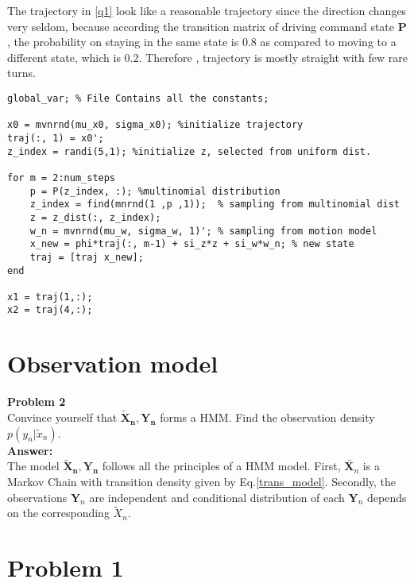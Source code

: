 \documentclass[a4paper]{article}
\begin{document}
The trajectory in \ref{q1} look like a reasonable trajectory since the direction changes very seldom, because according the transition matrix of driving command state $\boldsymbol{P}$, the probability on staying in the same state is $0.8$ as compared to moving to a different state, which  is $0.2$. Therefore , trajectory is mostly straight with few rare turns.\\

\begin{lstlisting}
global_var; % File Contains all the constants; 

x0 = mvnrnd(mu_x0, sigma_x0); %initialize trajectory
traj(:, 1) = x0'; 
z_index = randi(5,1); %initialize z, selected from uniform dist.

for m = 2:num_steps    
    p = P(z_index, :); %multinomial distribution
    z_index = find(mnrnd(1 ,p ,1));  % sampling from multinomial dist
    z = z_dist(:, z_index); 
    w_n = mvnrnd(mu_w, sigma_w, 1)'; % sampling from motion model 
    x_new = phi*traj(:, m-1) + si_z*z + si_w*w_n; % new state
    traj = [traj x_new];
end

x1 = traj(1,:);
x2 = traj(4,:);

\end{lstlisting}

\section*{Observation model}


\textbf{Problem 2}\\
Convince yourself that $\boldsymbol{\tilde{X}_n, \boldsymbol{Y}_n}$ forms a HMM. Find the observation density $p(y_n|\tilde{x}_n)$. \\
\textbf{Answer:} \\
The model $\boldsymbol{\tilde{X}_n, \boldsymbol{Y}_n}$ follows all the principles of a HMM model. First,  $\tilde{\boldsymbol{X}_n}$ is a Markov Chain with transition density given by  Eq.\ref{trans_model}. Secondly, the observations $\boldsymbol{Y}_n$ are independent and conditional distribution of each $\boldsymbol{Y}_n$ depends on the corresponding $\tilde{X}_n$. 

\section*{Problem 1}
\end{document}
